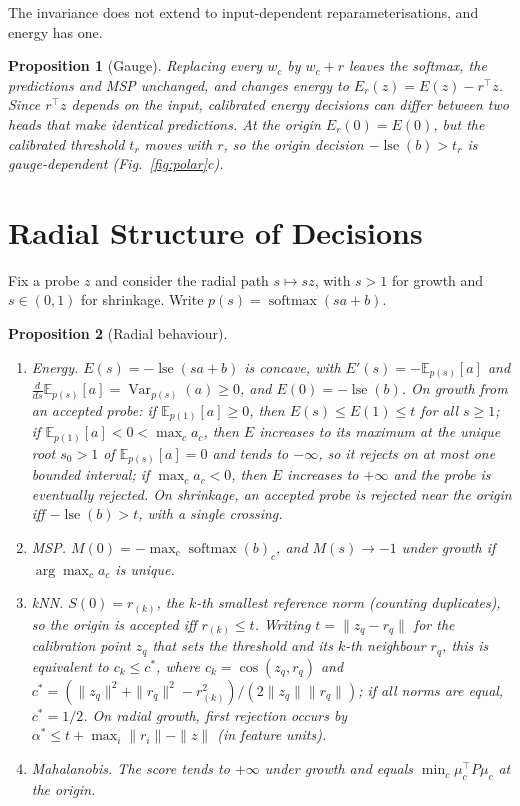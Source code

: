 \documentclass[twoside]{article}
\newtheorem{proposition}{Proposition}
\theoremstyle{definition}
\theoremstyle{remark}
\DeclareMathOperator{\lse}{lse}
\DeclareMathOperator{\softmax}{softmax}
\newcommand{\E}{\mathbb{E}}
\newcommand{\Var}{\operatorname{Var}}
\begin{document}
The invariance does not extend to input-dependent reparameterisations, and energy has one.

\begin{proposition}[Gauge]\label{prop:gauge}
Replacing every $w_c$ by $w_c+r$ leaves the softmax, the predictions and MSP unchanged, and changes energy
to $E_r(z)=E(z)-r^\top z$. Since $r^\top z$ depends on the input, calibrated energy decisions can differ
between two heads that make identical predictions. At the origin $E_r(0)=E(0)$, but the calibrated
threshold $t_r$ moves with $r$, so the origin decision $-\lse(b)>t_r$ is gauge-dependent
(Fig.~\ref{fig:polar}c).
\end{proposition}

\section{Radial Structure of Decisions}\label{sec:radial}

Fix a probe $z$ and consider the radial path $s\mapsto sz$, with $s>1$ for growth and $s\in(0,1)$ for
shrinkage. Write $p(s)=\softmax(sa+b)$.

\begin{proposition}[Radial behaviour]\label{prop:radial}
\begin{enumerate}
\item[(a)] \emph{Energy.} $E(s)=-\lse(sa+b)$ is concave, with $E'(s)=-\E_{p(s)}[a]$ and
$\frac{d}{ds}\E_{p(s)}[a]=\Var_{p(s)}(a)\ge 0$, and $E(0)=-\lse(b)$. On growth from an accepted probe:
if $\E_{p(1)}[a]\ge 0$, then $E(s)\le E(1)\le t$ for all $s\ge 1$; if $\E_{p(1)}[a]<0<\max_c a_c$, then $E$
increases to its maximum at the unique root $s_0>1$ of $\E_{p(s)}[a]=0$ and tends to $-\infty$, so it
rejects on at most one bounded interval; if $\max_c a_c<0$, then $E$ increases to $+\infty$ and the probe
is eventually rejected. On shrinkage, an accepted probe is rejected near the origin iff $-\lse(b)>t$, with
a single crossing.
\item[(b)] \emph{MSP.} $M(0)=-\max_c\softmax(b)_c$, and $M(s)\to-1$ under growth if $\arg\max_c a_c$ is
unique.
\item[(c)] \emph{kNN.} $S(0)=r_{(k)}$, the $k$-th smallest reference norm (counting duplicates), so the
origin is accepted iff $r_{(k)}\le t$. Writing $t=\|z_q-r_q\|$ for the calibration point $z_q$ that sets the
threshold and its $k$-th neighbour $r_q$, this is equivalent to $c_k\le c^*$, where $c_k=\cos(z_q,r_q)$ and
$c^*=(\|z_q\|^2+\|r_q\|^2-r_{(k)}^2)/(2\|z_q\|\|r_q\|)$; if all norms are equal, $c^*=1/2$. On radial
growth, first rejection occurs by $\alpha^*\le t+\max_i\|r_i\|-\|z\|$ (in feature units).
\item[(d)] \emph{Mahalanobis.} The score tends to $+\infty$ under growth and equals $\min_c\mu_c^\top P\mu_c$
at the origin.
\end{enumerate}
\end{proposition}
\end{document}
